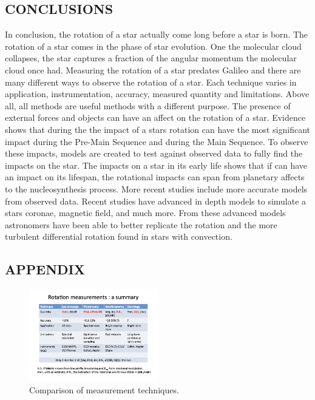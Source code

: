 \documentclass[a4paper, 12pt]{article}
\begin{document}
\begin{center}
\section{CONCLUSIONS}
\end{center}

In conclusion, the rotation of a star actually come long before a star is born. The rotation of a star comes in the phase of star evolution. One the molecular cloud collapses, the star captures a fraction of the angular momentum the molecular cloud once had. Measuring the rotation of a star predates Galileo and there are many different ways to observe the rotation of a star. Each technique varies in application, instrumentation, accuracy, measured quantity and limitations. Above all, all methods are useful methods with a different purpose. The presence of external forces and objects can have an affect on the rotation of a star. Evidence shows that during the the impact of a stars rotation can have the most significant impact during the Pre-Main Sequence and during the Main Sequence. To observe these impacts, models are created to test against observed data to fully find the impacts on the star. The impacts on a star in its early life shows that if can have an impact on its lifespan, the rotational impacts can span from planetary affects to the nucleosynthesis process. More recent studies include more accurate models from observed data. Recent studies have advanced in depth models to simulate a stars coronae, magnetic field, and much more. From these advanced models astronomers have been able to better replicate the rotation and the more turbulent differential rotation found in stars with convection.  


\newpage

\begin{center}
\nocite{*}


\end{center}

\newpage

\begin{center}
\section{APPENDIX}
\end{center}

\begin{figure}[h]
    \centering
    \includegraphics[width=0.5\textwidth]{fig2.png}
    \caption{Comparison of measurement techniques.}
    \label{fig:mesh1}
\end{figure}
\end{document}
